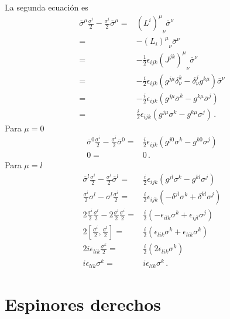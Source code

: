 \begin{frame}
La segunda ecuación es
\begin{align*}
\overline{\sigma}^{\mu} \frac{{\sigma^i}}{2}-\frac{{\sigma^i}}{2}\overline{\sigma}^{\mu}=&{\left(L^i  \right)^{\mu}}_{\nu}\overline{\sigma}^\nu \nonumber\\
 =&-{\left(L_i  \right)^{\mu}}_{\nu}\overline{\sigma}^\nu \nonumber\\
=&-\tfrac{1}{2}\epsilon_{ijk}{\left(J^{jk}  \right)^{\mu}}_{\nu}\overline{\sigma}^\nu \nonumber\\
 =&-\tfrac{i}{2}\epsilon_{ijk}\left(g^{j\mu}\delta^{k}_{\nu}-\delta^{j}_{\nu}g^{k\mu}  \right)\overline{\sigma}^\nu \nonumber\\
 =&-\tfrac{i}{2}\epsilon_{ijk}\left(g^{j\mu}\overline{\sigma}^k-g^{k\mu}\overline{\sigma}^j  \right) \nonumber\\
 =&\tfrac{i}{2}\epsilon_{ijk}\left(g^{j\mu}{\sigma}^k-g^{k\mu}{\sigma}^j  \right)\,.
\end{align*}
Para $\mu=0$
\begin{align*}
  \overline{\sigma}^{0} \frac{{\sigma^i}}{2}-\frac{{\sigma^i}}{2}\overline{\sigma}^{0}=& \frac{i}{2}\epsilon_{ijk}\left(g^{j0}{\sigma}^k-g^{k0}{\sigma}^j  \right)\nonumber\\
0=&0 \,.
\end{align*}
Para $\mu=l$
\begin{align*}
  \overline{\sigma}^l \frac{{\sigma^i}}{2}-\frac{{\sigma^i}}{2}\overline{\sigma}^l=&\frac{i}{2}\epsilon_{ijk}\left(g^{jl}{\sigma}^k-g^{kl}{\sigma}^j  \right)\nonumber\\
   \frac{{\sigma^i}}{2}{\sigma}^l -{\sigma}^l \frac{{\sigma^i}}{2}=&\frac{i}{2}\epsilon_{ijk}\left(-\delta^{jl}{\sigma}^k+\delta^{kl}{\sigma}^j  \right)\nonumber\\
  2\frac{\sigma^i}{2}\frac{\sigma^l}{2} -2\frac{\sigma^l}{2}\frac{\sigma^i}{2}=&\frac{i}{2}\left(-\epsilon_{ilk}{\sigma}^k+\epsilon_{ijl}{\sigma}^j  \right)\nonumber\\
 2\left[ \frac{\sigma^i}{2},\frac{\sigma^l}{2} \right]=&\frac{i}{2}\left(\epsilon_{lik}{\sigma}^k+\epsilon_{lik}{\sigma}^k  \right)\nonumber\\
 2i\epsilon_{lik}\frac{\sigma^{k}}{2}=&\frac{i}{2}\left(2\epsilon_{lik}  \sigma^{k}\right)\nonumber\\
 i\epsilon_{lik}{\sigma^{k}}=&i\epsilon_{lik}  \sigma^{k}\,.
\end{align*}

\end{frame}


\section{Espinores derechos}

